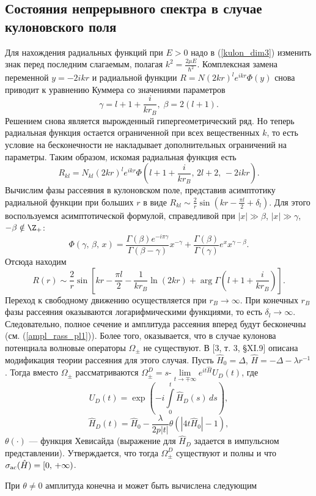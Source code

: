 \documentclass[a4paper
]{article}
\begin{document}
\subsection{Состояния непрерывного спектра в случае кулоновского поля}
Для нахождения радиальных функций при $E>0$ надо в (\ref{kulon_dim3})
изменить знак перед последним слагаемым, полагая $k^2=\frac{2\mu E}
{\hbar^2}$. Комплексная замена переменной $y=-2ikr$ и радиальной
функции $R=N(2kr)^le^{ikr}\Phi(y)$ снова приводит к уравнению
Куммера со значениями параметров
$$\gamma=l+1+\frac{i}{kr_B}, \; \beta=2(l+1).$$ Решением снова является
вырожденный гипергеометрический ряд. Но теперь радиальная функция
остается ограниченной при всех вещественных $k$, то есть условие на
бесконечности не накладывает дополнительных ограничений на параметры.
Таким образом, искомая радиальная функция есть $$R_{kl}=N_{kl}(2kr)
^le^{ikr}\Phi\left(l+1+\frac{i}{kr_B}, \, 2l+2, \, -2ikr\right).$$
Вычислим фазы рассеяния в кулоновском поле, представив асимптотику
радиальной функции при больших $r$ в виде $R_{kl}\sim \frac{2}{r}
\sin(kr-\frac{\pi l}{2}+\delta_l)$. Для этого воспользуемся асимптотической
формулой, справедливой при $|x|\gg \beta$, $|x|\gg \gamma$, $-\beta\notin
\Z_+$: $$\Phi(\gamma, \, \beta, \, x)=\frac{\Gamma(\beta)e^{-i\pi\gamma}}
{\Gamma(\beta-\gamma)}x^{-\gamma}+\frac{\Gamma(\beta)}{\Gamma(\gamma)}e^x
x^{\gamma-\beta}.$$
Отсюда находим $$R(r)\sim \frac{2}{r}\sin\left[kr-\frac{\pi l}{2}-
\frac{1}{kr_B}\ln (2kr)+\arg \Gamma\left(l+1+\frac{i}{kr_B}\right)\right].$$
Переход к свободному движению осуществляется при $r_B\rightarrow \infty$.
При конечных $r_B$ фазы рассеяния оказываются логарифмическими функциями,
то есть $\delta_l\rightarrow \infty$. Следовательно, полное сечение
и амплитуда рассеяния вперед будут бесконечны (см. (\ref{ampl_rass_pl1})).
Более того, оказывается, что в случае кулонова потенциала волновые
операторы $\Omega_\pm$ не существуют. В [3, т. 3, \S XI.9] описана
модификация теории рассеяния для этого случая. Пусть $\hat H_0=\Delta$,
$\hat H=-\Delta-\lambda r^{-1}$. Тогда вместо $\Omega_\pm$
рассматриваются $\Omega_\pm^D=s$-$\lim \limits_{t\rightarrow \mp \infty}
e^{it\hat H}U_D(t)$, где $$U_D(t)=\exp\left(-i\int \limits_0^t \hat H_D(s)
\, ds\right),$$ $$\hat H_D(t)=\hat H_0-\frac{\lambda}{2p|t|}\theta(|4t
\hat H_0|-1),$$ $\theta(\cdot)$ --- функция Хевисайда (выражение для
$\hat H_D$ задается в импульсном представлении). Утверждается, что тогда
$\Omega_\pm^D$ существуют и полны и что $\sigma_{{\rm ac}}(\hat H)=[0, \,
+\infty)$. \par
При $\theta \ne 0$ амплитуда конечна и может быть вычислена следующим
\end{document}
